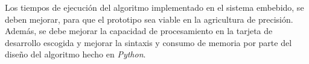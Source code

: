 Los tiempos de ejecución del algoritmo implementado en el sistema embebido, se deben mejorar, para que el prototipo sea viable en la agricultura de precisión. Además, se debe mejorar la capacidad de procesamiento en la tarjeta de desarrollo escogida y mejorar la sintaxis y consumo de memoria por parte del diseño del algoritmo hecho en \textit{Python}.














